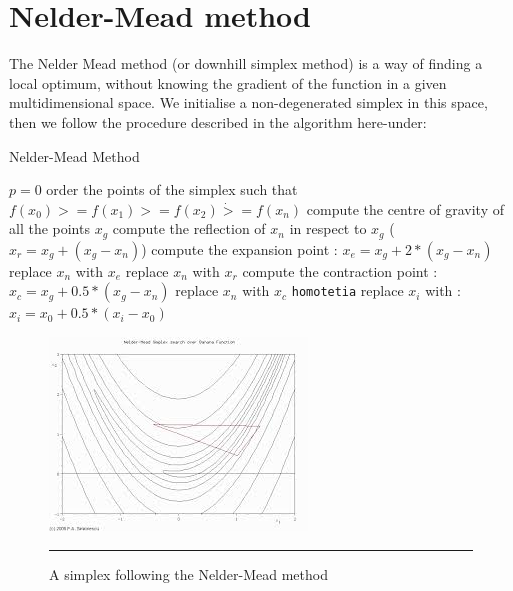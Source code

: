 \section{Nelder-Mead method}

The Nelder Mead method \cite{simplex} (or downhill simplex method) is a way of finding a local optimum, without knowing the gradient of the function in a given multidimensional space. We initialise a non-degenerated simplex in this space, then we follow the procedure described in the algorithm here-under:

\begin{algorithm}
    \caption{Nelder-Mead Method}
    \begin{algorithmic}
    \STATE $ p = 0 $
        \REPEAT 
            \STATE order the points of the simplex such that $f(x_0) >= f(x_1) >= f(x_2) \dot >= f(x_n)$
            \STATE compute the centre of gravity of all the points $x_g$
            \STATE compute the reflection of $x_n$ in respect to $x_g$ ($x_r = x_g + (x_g - x_n )$)
                \STATE compute the expansion point : $x_e = x_g + 2 * (x_g - x_n )$ 
                    \STATE replace $x_n$ with $x_e$ 
                \ELSE
                    \STATE replace $x_n$ with $x_r$ 
                \ENDIF
            \ELSE 
                \STATE compute the contraction point : $x_c = x_g + 0.5 * (x_g - x_n )$ 
                    \STATE replace $x_n$ with $x_c$ 
                \ELSE
                    \STATE \verb?homotetia?
                        \STATE replace $x_i$ with : $x_i = x_0 + 0.5 * (x_i - x_0 )$ 
                    \ENDFOR
                \ENDIF
            \ENDIF
    
    \end{algorithmic}
\end{algorithm}


\begin{figure}[htbp]
    \centering
    \includegraphics[scale=0.7]{Figures/nelder_mead.jpg}
    \rule{35em}{0.5pt}
    \caption[A simplex following the Nelder-Mead method]{A simplex following the Nelder-Mead method}
    \label{fig:nelder_mead}
\end{figure}


